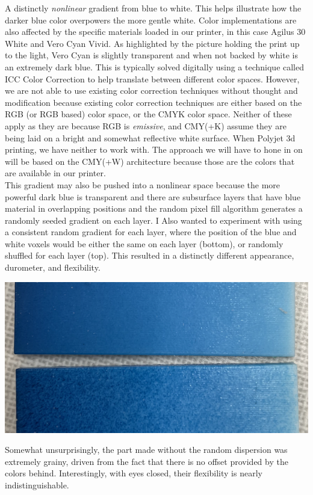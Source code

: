 \documentclass{article}
\begin{document}
\begin{multicols}{2}
\noindent
A distinctly \textit{nonlinear} gradient from blue to white. This helps illustrate how the darker blue color overpowers the more gentle white. Color implementations are also affected by the specific materials loaded in our printer, in this case Agilus 30 White and Vero Cyan Vivid. As highlighted by the picture holding the print up to the light, Vero Cyan is slightly transparent and when not backed by white is an extremely dark blue. This is typically solved digitally using a technique called ICC Color Correction to help translate between different color spaces. However, we are not able to use existing color correction techniques without thought and modification because existing color correction techniques are either based on the RGB (or RGB based) color space, or the CMYK color space. Neither of these apply as they are because RGB is \textit{emissive}, and CMY(+K) assume they are being laid on a bright and somewhat reflective white surface. When Polyjet 3d printing, we have neither to work with. The approach we will have to hone in on will be based on the CMY(+W) architecture because those are the colors that are available in our printer.
\\
This gradient may also be pushed into a nonlinear space because the more powerful dark blue is transparent and there are subsurface layers that have blue material in overlapping positions and the random pixel fill algorithm generates a randomly seeded gradient on each layer. I Also wanted to experiment with using a consistent random gradient for each layer, where the position of the blue and white voxels would be either the same on each layer (bottom), or randomly shuffled for each layer (top).  This resulted in a distinctly different appearance, durometer, and flexibility.

\noindent
\includegraphics[width=\columnwidth]{grainy-vs-not-gradient}

\noindent
Somewhat unsurprisingly, the part made without the random dispersion was extremely grainy, driven from the fact that there is no offset provided by the colors behind. Interestingly, with eyes closed, their flexibility is nearly indistinguishable.


\end{multicols}
\end{document}

